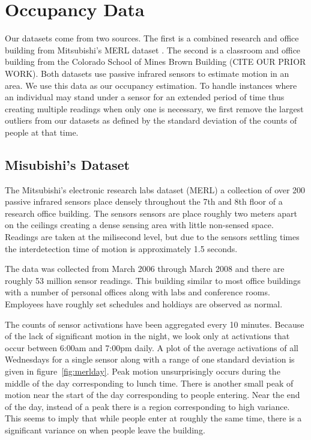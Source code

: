 \documentclass{acm_proc_article-sp}
\begin{document}
\section{Occupancy Data}
 
Our datasets come from two sources.  The first is a combined research and office building from Mitsubishi's MERL dataset \cite{Wren2007}.  The second is a classroom and office building from the Colorado School of Mines Brown Building (CITE OUR PRIOR WORK).  Both datasets use passive infrared sensors to estimate motion in an area.  We use this data as our occupancy estimation.  To handle instances where an individual may stand under a sensor for an extended period of time thus creating multiple readings when only one is necessary, we first remove the largest outliers from our datasets as defined by the standard deviation of the counts of people at that time.

\subsection{Misubishi's Dataset} 

The Mitsubishi's electronic research labs dataset (MERL) a collection of over 200 passive infrared sensors place densely throughout the 7th and 8th floor of a research office building.  The sensors sensors are place roughly two meters apart on the ceilings creating a dense sensing area with little non-sensed space.  Readings are taken at the milisecond level, but due to the sensors settling times the interdetection time of motion is approximately 1.5 seconds.  

The data was collected from March 2006 through March 2008 and there are roughly 53 million sensor readings.  This building similar to most office buildings with a number of personal offices along with labs and conference rooms.  Employees have roughly set schedules and holdiays are observed as normal. 

The counts of sensor activations have been aggregated every 10 minutes.  Because of the lack of significant motion in the night, we look only at activations that occur between 6:00am and 7:00pm daily.  A plot of the average activations of all Wednesdays for a single sensor along with a range of one standard deviation is given in figure~\ref{fig:merlday}.  Peak motion unsurprisingly occurs during the middle of the day corresponding to lunch time.  There is another small peak of motion near the start of the day corresponding to people entering.  Near the end of the day, instead of a peak there is a region corresponding to high variance.  This seems to imply that while people enter at roughly the same time, there is a significant variance on when people leave the building.
\end{document}
